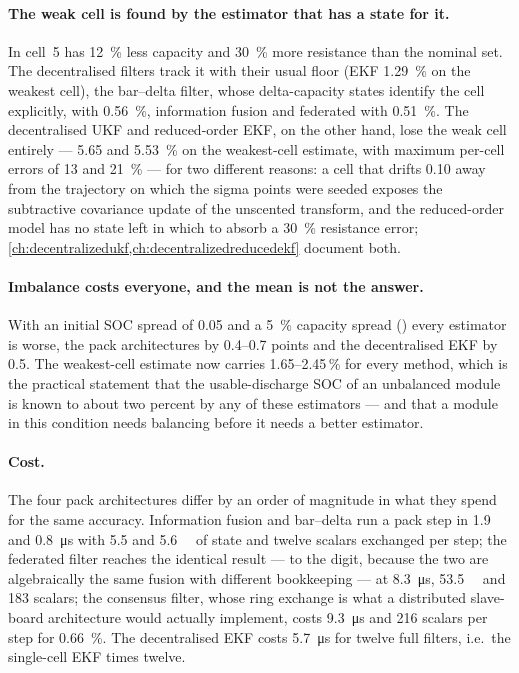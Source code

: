 \paragraph{The weak cell is found by the estimator that has a state for it.} In
 cell~5 has \SI{12}{\percent} less capacity and \SI{30}{\percent} more
resistance than the nominal set. The decentralised filters track it with their usual floor
(EKF \SI{1.29}{\percent} on the weakest cell), the bar--delta filter, whose delta-capacity states
identify the cell explicitly, with \SI{0.56}{\percent}, information fusion and federated with
\SI{0.51}{\percent}. The decentralised UKF and reduced-order EKF, on the other hand, lose the
weak cell entirely --- \num{5.65} and \SI{5.53}{\percent} on the weakest-cell estimate, with
maximum per-cell errors of \num{13} and \SI{21}{\percent} --- for two different reasons: a cell that drifts \num{0.10} away from the
trajectory on which the sigma points were seeded exposes the subtractive covariance update of
the unscented transform, and the reduced-order model has no state left in which to absorb a
\SI{30}{\percent} resistance error; \cref{ch:decentralizedukf,ch:decentralizedreducedekf}
document both.

\paragraph{Imbalance costs everyone, and the mean is not the answer.} With an initial SOC
spread of \num{0.05} and a \SI{5}{\percent} capacity spread () every
estimator is worse, the pack architectures by \SIrange{0.4}{0.7}{} points and the decentralised
EKF by \num{0.5}. The weakest-cell estimate now carries \num{1.65}--\num{2.45}\,\% for every
method, which is the practical statement that the usable-discharge SOC of an unbalanced module
is known to about two percent by any of these estimators --- and that a module in this
condition needs balancing before it needs a better estimator.

\paragraph{Cost.} The four pack architectures differ by an order of magnitude in what they
spend for the same accuracy. Information fusion and bar--delta run a pack step in \num{1.9}
and \SI{0.8}{\micro\second} with \SI{5.5}{} and \SI{5.6}{\kilo\byte} of state and twelve
scalars exchanged per step; the federated filter reaches the identical result --- to the digit,
because the two are algebraically the same fusion with different bookkeeping --- at
\SI{8.3}{\micro\second}, \SI{53.5}{\kilo\byte} and 183 scalars; the consensus filter, whose
ring exchange is what a distributed slave-board architecture would actually implement, costs
\SI{9.3}{\micro\second} and 216 scalars per step for \SI{0.66}{\percent}. The decentralised EKF
costs \SI{5.7}{\micro\second} for twelve full filters, i.e.\ the single-cell EKF times twelve.

